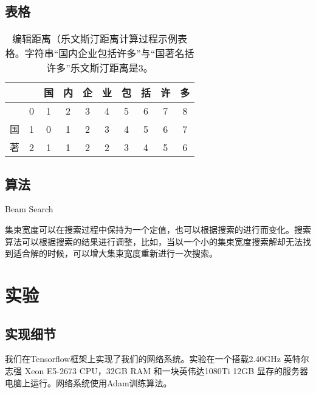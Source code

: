 \documentclass[winfonts, thesis]{njuthesis}
\begin{document}
\begin{spacing}{1.625}
\section{表格}

\begin{table}[htbp]
\setlength{\belowcaptionskip}{7pt}
  \centering
\begin{tabular}{|c|c|c|c|c|c|c|c|c|c|}
\hline 
  &   & 国 & 内 & 企 & 业 & 包 & 括 & 许 & 多 \\ 
\hline 
  & 0 & 1 & 2 & 3 & 4 & 5 & 6 & 7 & 8 \\ 
\hline 
国 & 1 & 0 & 1 & 2 & 3 & 4 & 5 & 6 & 7 \\ 
\hline 
著 & 2 & 1 & 1 & 2 & 2 & 3 & 4 & 5 & 6 \\ 
\hline
\end{tabular} 
\vspace{0.2cm}
  \caption{编辑距离（乐文斯汀距离计算过程示例表格。字符串``国内企业包括许多''与``国著名括许多''乐文斯汀距离是3。}\label{table:ld}
\end{table}


\section{算法}

\begin{algorithm}
\caption{Beam Search}
\label{alg:beam}
\begin{algorithmic}[1]
\ELSE 
{}
\ENDIF
\ENDWHILE
\end{algorithmic}
\end{algorithm}

集束宽度可以在搜索过程中保持为一个定值，也可以根据搜索的进行而变化。搜索算法可以根据搜索的结果进行调整，比如，当以一个小的集束宽度搜索解却无法找到适合解的时候，可以增大集束宽度重新进行一次搜索。



\chapter{实验}

\section{实现细节}
我们在Tensorflow框架上实现了我们的网络系统。实验在一个搭载2.40GHz 英特尔志强 Xeon E5-2673 CPU，32GB RAM 和一块英伟达1080Ti 12GB 显存的服务器电脑上运行。网络系统使用Adam训练算法。




\end{spacing}
\end{document}
